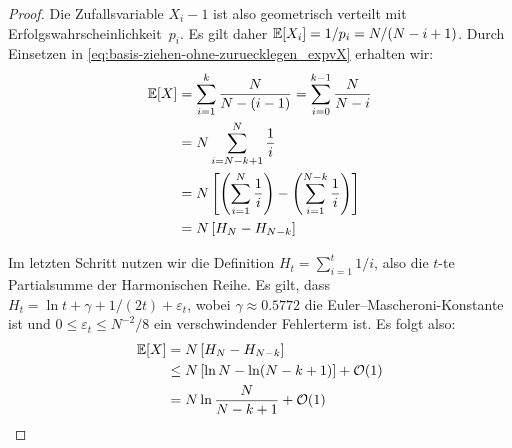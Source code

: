 \begin{proof}
    Die Zufallsvariable $X_i - 1$ ist also geometrisch verteilt mit Erfolgswahrscheinlichkeit~$p_i$.
    Es gilt daher $\mathbb{E}\!\left[X_i\right] = 1 / p_i = N / (N - i + 1)$. Durch Einsetzen in \cref{eq:basis-ziehen-ohne-zuruecklegen_expvX} erhalten wir:
    \vspace{-2ex}
    \begin{align}
        \mathbb{E}\!\left[X\right] & = \sum_{i=1}^k \frac{N}{N-(i-1)} = \sum_{i=0}^{k-1} \frac{N}{N - i}                                      \\
                 & = N \sum_{i=N-k+1}^N \frac{1}{i}                                                                         \\
                 & = N \left[ \left( \sum_{i=1}^N \frac{1}{i} \right) - \left( \sum_{i=1}^{N-k} \frac{1}{i} \right) \right] \\
                 & = N \left[ H_N - H_{N-k} \right]
    \end{align}

    Im letzten Schritt nutzen wir die Definition $H_t = \sum_{i=1}^t 1/i$, also die $t$-te Partialsumme der Harmonischen Reihe.
    Es gilt, dass $H_t = \ln t + \gamma + 1/(2t) + \varepsilon_t$, wobei $\gamma \approx 0.5772$ die Euler–Mascheroni-Konstante ist und $0 \le \varepsilon_t \le N^{-2}/8$ ein verschwindender Fehlerterm ist.
    Es folgt also:
    \begin{align}
        \mathbb{E}\!\left[X\right] & = N \left[ H_N - H_{N-k} \right]                      \\
                 & \le N \left[ \ln N - \ln (N - k + 1) \right] + \mathcal{O}\!\left(1\right) \\
                 & = N \ln \frac{N}{N - k + 1} + \mathcal{O}\!\left(1\right)
    \end{align}
\end{proof}

